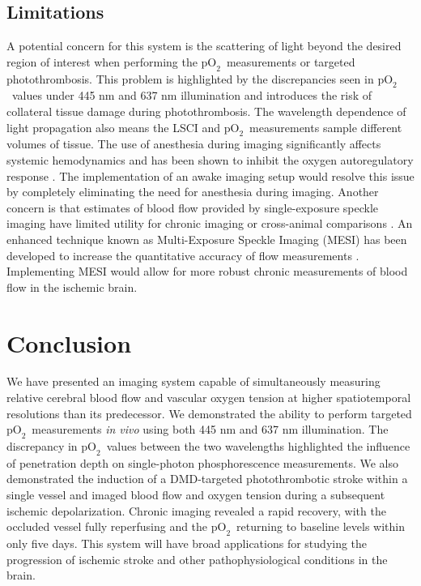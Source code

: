 \documentclass[12pt]{spieman}  %
\newcommand{\pO}{\ensuremath{\text{pO}_2}} 	            %
\begin{document}
\begin{spacing}{2}
\subsection{Limitations}
A potential concern for this system is the scattering of light beyond the desired region of interest when performing the \pO\ measurements or targeted photothrombosis. This problem is highlighted by the discrepancies seen in \pO\ values under 445 nm and 637 nm illumination and introduces the risk of collateral tissue damage during photothrombosis. The wavelength dependence of light propagation also means the LSCI and \pO\ measurements sample different volumes of tissue. The use of anesthesia during imaging significantly affects systemic hemodynamics \cite{Janssen:2004ih} and has been shown to inhibit the oxygen autoregulatory response \cite{Aksenov:2012wh}. The implementation of an awake imaging setup \cite{Dombeck:2007gr} would resolve this issue by completely eliminating the need for anesthesia during imaging. Another concern is that estimates of blood flow provided by single-exposure speckle imaging have limited utility for chronic imaging or cross-animal comparisons \cite{Kazmi:2013hp}. An enhanced technique known as Multi-Exposure Speckle Imaging (MESI) has been developed to increase the quantitative accuracy of flow measurements \cite{Parthasarathy:2008el}. Implementing MESI would allow for more robust chronic measurements of blood flow in the ischemic brain.


\section{Conclusion}
\label{sect:conclusion}
We have presented an imaging system capable of simultaneously measuring relative cerebral blood flow and vascular oxygen tension at higher spatiotemporal resolutions than its predecessor. We demonstrated the ability to perform targeted \pO\ measurements \textit{in vivo} using both 445 nm and 637 nm illumination. The discrepancy in \pO\ values between the two wavelengths highlighted the influence of penetration depth on single-photon phosphorescence measurements. We also demonstrated the induction of a DMD-targeted photothrombotic stroke within a single vessel and imaged blood flow and oxygen tension during a subsequent ischemic depolarization. Chronic imaging revealed a rapid recovery, with the occluded vessel fully reperfusing and the \pO\ returning to baseline levels within only five days. This system will have broad applications for studying the progression of ischemic stroke and other pathophysiological conditions in the brain.



\end{spacing}
\end{document}
